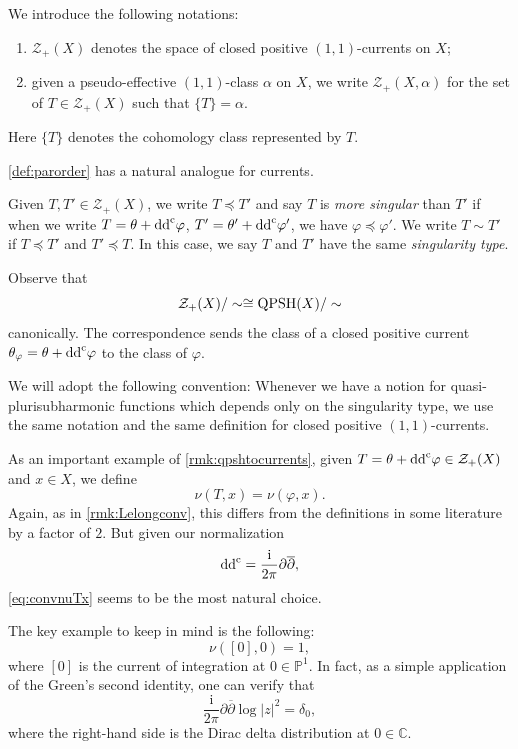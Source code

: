 \begin{definition}\label{def:spaceofcurrents}
    We introduce the following notations:
    \begin{enumerate}
        \item\label{itm:def:spaceofcurrents:1} $\mathcal{Z}_+(X)$  denotes the space of closed positive $(1,1)$-currents on $X$;
        \item\label{itm:def:spaceofcurrents:2} given a pseudo-effective $(1,1)$-class $\alpha$ on $X$, we write $\mathcal{Z}_+(X,\alpha)$  for the set of $T\in \mathcal{Z}_+(X)$ such that $\{T\}=\alpha$.
    \end{enumerate}
\end{definition}
Here $\{T\}$ denotes the cohomology class represented by $T$.

\cref{def:parorder} has a natural analogue for currents.

\begin{definition}\label{def:pshfunctions:L1594}
Given $T,T'\in \mathcal{Z}_+(X)$, we write $T\preceq T'$
and say $T$ is \emph{more singular} than $T'$ if when we write $T=\theta+\mathrm{dd}^{\mathrm{c}}\varphi$, $T'=\theta'+\mathrm{dd}^{\mathrm{c}} \varphi'$, we have $\varphi\preceq \varphi'$. We write $T\sim T'$
if $T\preceq T'$ and $T'\preceq T$. In this case, we say $T$ and $T'$ have the same \emph{singularity type}.
\end{definition}


\begin{remark}\label{rmk:qpshtocurrents}
Observe that
\[
\mathcal{Z}_+(X)/\sim\cong \mathrm{QPSH}(X)/\sim
\]
canonically. The correspondence sends the class of a closed positive current $\theta_{\varphi}=\theta+\mathrm{dd}^{\mathrm{c}} \varphi$ to the class of $\varphi$.

We will adopt the following convention: Whenever we have a notion for quasi-plurisubharmonic functions which depends only on the singularity type, we use the same notation and the same definition for closed positive $(1,1)$-currents.
\end{remark}

\begin{example}\label{ex:Lelongcurrent}
    As an important example of \cref{rmk:qpshtocurrents}, given $T=\theta+\mathrm{dd}^{\mathrm{c}}\varphi\in \mathcal{Z}_+(X)$ and $x\in X$, we define
\begin{equation}\label{eq:convnuTx}
\nu(T,x)=\nu(\varphi,x).
\end{equation}
Again, as in \cref{rmk:Lelongconv}, this differs from the definitions in some literature by a factor of $2$. But given our normalization
\[
\mathrm{dd}^{\mathrm{c}}=\frac{\mathrm{i}}{2\pi}\partial\overline{\partial},
\]
\eqref{eq:convnuTx} seems to be the most natural choice.

The key example to keep in mind is the following:
\[
\nu([0],0)=1,
\]
where $[0]$ is the current of integration at $0\in \mathbb{P}^1$. In fact, as a simple application of the Green's second identity, one can verify that
\[
\frac{\mathrm{i}}{2\pi}\partial\overline{\partial}\log |z|^2=\delta_0,
\]
where the right-hand side is the Dirac delta distribution at $0\in \mathbb{C}$.
\end{example}

